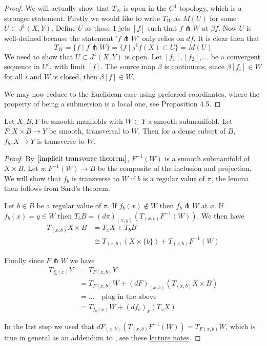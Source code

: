 \documentclass[12pt]{article}
\begin{document}
\begin{proof}
    We will actually show that $T_W$ is open in the $C^1$ topology, which is a stronger statement. Firstly we would like to write $T_W$ as $M(U)$ for some $U\subset J^1(X, Y)$. Define $U$ as those $1$-jets $[f]$ such that $f \pitchfork W$ at $\beta f$. Now $U$ is well-defined because the statement '$f\pitchfork W$' only relies on $df$. It is clear then that 
    $$
    T_W = \{ f \mid f\pitchfork W\} = \{ f \mid j^1 f (X) \subset U\} = M(U)
    $$
    We need to show that $U \subset J^1(X, Y)$ is open. Let $[f_1], [f_2], \dots $ be a convergent sequence in $U^c$, with limit $[f]$. The source map $\beta$ is continuous, since $\beta [f_i] \in W$ for all $i$ and $W$ is closed, then $\beta [f] \in W$. \par 
    We may now reduce to the Euclidean case using preferred coordinates, where the property of being a submersion is a local one, see \cite{singularities} Proposition 4.5. 
\end{proof}


\begin{lemma}
    Let $X, B, Y$ be smooth manifolds with $W \subset Y$ a smooth submanifold. Let $F : X \times B \to Y$ be smooth, transversal to $W$. Then for a dense subset of $B$, $f_b: X \to Y$ is transverse to $W$. 
\end{lemma}

\begin{proof}
    By $\Autoref{implicit transverse theorem}$, $F^{-1}(W)$ is a smooth submanifold of $X \times B$. Let $\pi: F^{-1}(W) \to B$ be the composite of the inclusion and projection. We will show that $f_b$ is transverse to $W$ if $b$ is a regular value of $\pi$, the lemma then follows from Sard's theorem. \par
    Let $b \in B$ be a regular value of $\pi$. If $f_b(x) \not \in W$ then $f_b \pitchfork W$ at $x$. If $f_b(x) = y \in W$ then $T_b B = (d\pi)_{(x, y)} \left(T_{(x, b)} F^{-1}(W)\right) $. We then have 
    \begin{align*}
        T_{(x, b)} X\times B & = T_x X + T_b B \\ 
        & \cong T_{(x, b)} \left(X\times \{ b\} \right)+ T_{(x, b)} F^{-1} (W)
    \end{align*}
    
    
    Finally since $F \pitchfork W$ we have
    \begin{align*}
        T_{f_b(x)} Y & = T_{F(x, b)} Y \\ 
        & = T_{F(x, b)} W + (dF)_{(x, b)} \left( T_{(x, b)} X\times B\right) \\ 
        & = \dots \quad \text{plug in the above}\\ 
        & = T_{f_b(x)} W + (df_b)_x \left( T_x X \right)
    \end{align*}
    
    In the last step we used that $dF_{(x, b)}(T_{(x, b)}F^{-1}(W)) = T_{F(x, b)} W$, which is true in general as an addendum to , see these \href{http://staff.ustc.edu.cn/~wangzuoq/Courses/18F-Manifolds/Notes/Lec11.pdf}{lecture notes}. 
\end{proof}
\end{document}

